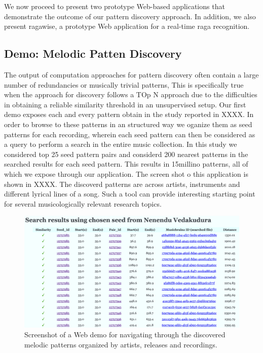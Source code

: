 We now proceed to present two prototype Web-based applications that demonstrate the outcome of our pattern discovery approach. In addition, we also present ragawise, a prototype Web application for a real-time raga recognition. 

\subsection*{Demo: Melodic Patten Discovery}

The output of computation approaches for pattern discovery often contain a large number of redundancies or musically trivial patterns, This is specifically true when the approach for discovery follows a TOp N approach due to the difficulties in obtaining a reliable similarity threshold in an unsupervised setup. Our first demo exposes each and every pattern obtain in the study reported in XXXX. In order to browse to these patterns in an structured way we oganize them as seed patterns for each recording, wherein each seed pattern can then be considered as a query to perform a search in the entire music collection. In this study we considered top 25 seed pattern pairs and considerd 200 nearest patterns in the searched results for each seed pattern. This results in 15millino patterns, all of which we expose through our application. The screen shot o this application is shown in XXXX. The discoverd patterns are across artists, instruments and different lyrical lines of a song. Such a tool can provide interesting starting point for several musicologically relevant research topics.

\begin{figure}
	\begin{center}
		\includegraphics[width=\figSizeHundred]{ch08_applications/figures/patternBrowsing1.png}
	\end{center}
	\caption{Screenshot of a Web demo for navigating through the discovered melodic patterns organized by artists, releases and recordings.}
	\label{fig:browser_patterns}
\end{figure}

